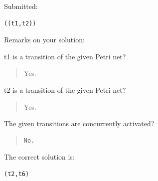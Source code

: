 Submitted:


\begin{verbatim}
((t1,t2))
\end{verbatim}


Remarks on your solution:

t1 is a transition of the given Petri net?\begin{quote}Yes.\end{quote}t2 is a transition of the given Petri net?\begin{quote}Yes.\end{quote}The given transitions are concurrently activated?

\begin{quote}
\begin{verbatim}
No.
\end{verbatim}
\end{quote}

The correct solution is:
\begin{verbatim}
(t2,t6)
\end{verbatim}


